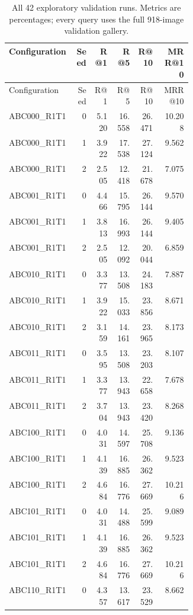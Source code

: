 \begingroup\footnotesize
\setlength{\tabcolsep}{3pt}
\begin{longtable}{@{}p{0.36\linewidth}rrrrr@{}}
\caption{All 42 exploratory validation runs. Metrics are percentages; every query uses the full 918-image validation gallery.}\\
\toprule
Configuration & Seed & R@1 & R@5 & R@10 & MRR@10 \\
\midrule\endfirsthead
\toprule
Configuration & Seed & R@1 & R@5 & R@10 & MRR@10 \\
\midrule\endhead
\bottomrule\endfoot
ABC000\_\allowbreak{}R1T1 & 0 & 5.120 & 16.558 & 26.471 & 10.208 \\
ABC000\_\allowbreak{}R1T1 & 1 & 3.922 & 17.538 & 27.124 & 9.562 \\
ABC000\_\allowbreak{}R1T1 & 2 & 2.505 & 12.418 & 21.678 & 7.075 \\
ABC001\_\allowbreak{}R1T1 & 0 & 4.466 & 15.795 & 26.144 & 9.570 \\
ABC001\_\allowbreak{}R1T1 & 1 & 3.813 & 16.993 & 26.144 & 9.405 \\
ABC001\_\allowbreak{}R1T1 & 2 & 2.505 & 12.092 & 20.044 & 6.859 \\
ABC010\_\allowbreak{}R1T1 & 0 & 3.377 & 13.508 & 24.183 & 7.887 \\
ABC010\_\allowbreak{}R1T1 & 1 & 3.922 & 15.033 & 23.856 & 8.671 \\
ABC010\_\allowbreak{}R1T1 & 2 & 3.159 & 14.161 & 23.965 & 8.173 \\
ABC011\_\allowbreak{}R1T1 & 0 & 3.595 & 13.508 & 23.203 & 8.107 \\
ABC011\_\allowbreak{}R1T1 & 1 & 3.377 & 13.943 & 22.658 & 7.678 \\
ABC011\_\allowbreak{}R1T1 & 2 & 3.704 & 13.943 & 23.420 & 8.268 \\
ABC100\_\allowbreak{}R1T1 & 0 & 4.031 & 14.597 & 25.708 & 9.136 \\
ABC100\_\allowbreak{}R1T1 & 1 & 4.139 & 16.885 & 26.362 & 9.523 \\
ABC100\_\allowbreak{}R1T1 & 2 & 4.684 & 16.776 & 27.669 & 10.216 \\
ABC101\_\allowbreak{}R1T1 & 0 & 4.031 & 14.488 & 25.599 & 9.089 \\
ABC101\_\allowbreak{}R1T1 & 1 & 4.139 & 16.885 & 26.362 & 9.523 \\
ABC101\_\allowbreak{}R1T1 & 2 & 4.684 & 16.776 & 27.669 & 10.216 \\
ABC110\_\allowbreak{}R1T1 & 0 & 4.357 & 13.617 & 23.529 & 8.662 \\

\end{longtable}
